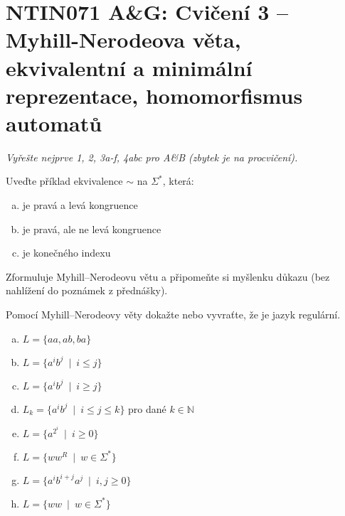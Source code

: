 \documentclass[a4paper,12pt]{amsart}
\begin{document}

\section*{NTIN071 A\&G: Cvičení 3 -- Myhill-Nerodeova věta, ekvivalentní a minimální reprezentace, homomorfismus automatů}


\medskip

\noindent\emph{Vyřešte nejprve 1, 2, 3a-f, 4abc pro A\&B (zbytek je na procvičení).}


\medskip\begin{problem}

    Uveďte příklad ekvivalence $\sim$ na $\Sigma^*$, která:

    \begin{enumerate}[(a)]\setlength\itemsep{12pt}
        \item je pravá a levá kongruence
        \item je pravá, ale ne levá kongruence
        \item je konečného indexu
    \end{enumerate}

\end{problem}


\medskip\begin{problem}
    
    Zformuluje Myhill--Nerodeovu větu a připomeňte si myšlenku důkazu (bez nahlížení do poznámek z přednášky).

\end{problem}


\medskip\begin{problem}

    Pomocí Myhill--Nerodeovy věty dokažte nebo vyvraťte, že je jazyk regulární.

    \begin{multicols}{2}

        \begin{enumerate}[(a)]\setlength\itemsep{12pt}
            \item $L=\{aa, ab, ba\}$
            \item $L=\{a^ib^j\ \mid\ i\leq j\}$
            \item $L=\{a^ib^j\ \mid\ i\geq j\}$
            \item $L_k=\{a^ib^j\ \mid\ i\leq j\leq k\}$ pro dané $k\in\mathbb N$
            \item $L=\{a^{2^i}\ \mid\ i\geq 0\}$
            \item $L=\{ww^R\ \mid \ w\in\Sigma^*\}$%
            \item $L=\{a^ib^{i+j}a^j\ \mid\ i,j\geq 0\}$
            \item $L=\{ww\ \mid \ w\in\Sigma^*\}$
        \end{enumerate}
        
    \end{multicols}
    

\end{problem}
\end{document}
